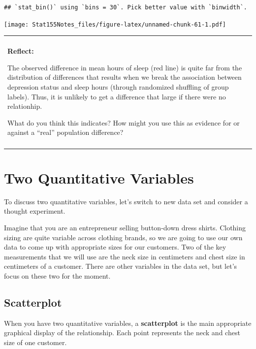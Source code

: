 \documentclass[]{book}
\newenvironment{reflect}
{
    \begin{center}
    
    \begin{tabular}{|p{0.8\textwidth}|}
    \rowcolor{LightBlue}
    \hline\\
    \rowcolor{LightBlue}
    \textbf{Reflect:}
}
{
    \\\rowcolor{LightBlue}
    \\\hline
    \end{tabular} 
    \end{center}
}
\begin{document}
\begin{verbatim}
## `stat_bin()` using `bins = 30`. Pick better value with `binwidth`.
\end{verbatim}

\texttt{[image: Stat155Notes\_files/figure-latex/unnamed-chunk-61-1.pdf]}

\begin{reflect}
The observed difference in mean hours of sleep (red line) is quite far
from the distribution of differences that results when we break the
association between depression status and sleep hours (through
randomized shuffling of group labels). Thus, it is unlikely to get a
difference that large if there were no relationhip.

What do you think this indicates? How might you use this as evidence for
or against a ``real'' population difference?
\end{reflect}

\hypertarget{two-quantitative-variables}{%
\section{Two Quantitative Variables}\label{two-quantitative-variables}}

To discuss two quantitative variables, let's switch to new data set and consider a thought experiment.

Imagine that you are an entrepreneur selling button-down dress shirts. Clothing sizing are quite variable across clothing brands, so we are going to use our own data to come up with appropriate sizes for our customers. Two of the key measurements that we will use are the neck size in centimeters and chest size in centimeters of a customer. There are other variables in the data set, but let's focus on these two for the moment.

\hypertarget{scatterplot}{%
\subsection{Scatterplot}\label{scatterplot}}

When you have two quantitative variables, a \textbf{scatterplot} is the main appropriate graphical display of the relationship. Each point represents the neck and chest size of one customer.
\end{document}
